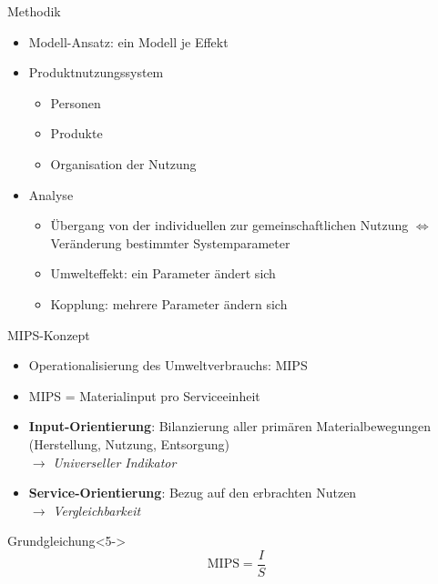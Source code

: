\documentclass[beamer, xcolor={table,usenames,dvipsnames}]{beamer}
\begin{document}
	\begin{frame}{Methodik}
            \begin{itemize}
                \pause
                \item Modell-Ansatz: ein Modell je Effekt
                \pause
                \item Produktnutzungssystem
                \begin{itemize}
                    \item Personen 
                    \item Produkte
                    \item Organisation der Nutzung
                \end{itemize}
                \pause
                \item Analyse
                \begin{itemize}
                    \item Übergang von der individuellen zur gemeinschaftlichen Nutzung $\Leftrightarrow$ Veränderung bestimmter Systemparameter
                    \item Umwelteffekt: ein Parameter ändert sich
                    \item Kopplung: mehrere Parameter ändern sich
                \end{itemize}
            \end{itemize}
	\end{frame}

	\begin{frame}{MIPS-Konzept}
		\begin{itemize}
			\item<1-> Operationalisierung des Umweltverbrauchs: MIPS %
			\item<2-> MIPS = Materialinput pro Serviceeinheit
			\item<3-> \textbf{Input-Orientierung}: Bilanzierung aller primären Materialbewegungen (Herstellung, Nutzung, Entsorgung) \\
			$\rightarrow$ \emph{Universeller Indikator}
			\item<4-> \textbf{Service-Orientierung}: Bezug auf den erbrachten Nutzen \\
			$\rightarrow$ \emph{Vergleichbarkeit}
		\end{itemize}
		\begin{block}{Grundgleichung}<5->
			$$\text{MIPS} = \frac{I}{S}$$
		\end{block}
	\end{frame}
\end{document}
